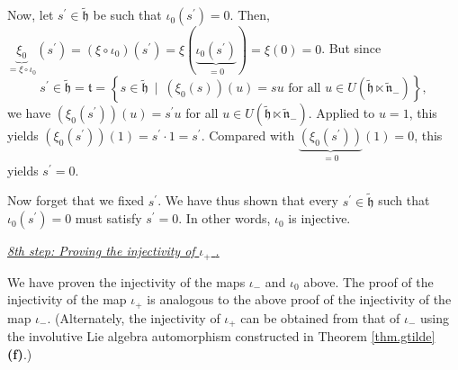 \documentclass[etingof-lie.tex]{subfiles}
\begin{document}
\begin{verlong}
Now, let $s^{\prime}\in\widetilde{\mathfrak{h}}$ be such that $\iota
_{0}\left(  s^{\prime}\right)  =0$. Then, $\underbrace{\xi_{0}}_{=\xi
\circ\iota_{0}}\left(  s^{\prime}\right)  =\left(  \xi\circ\iota_{0}\right)
\left(  s^{\prime}\right)  =\xi\left(  \underbrace{\iota_{0}\left(  s^{\prime
}\right)  }_{=0}\right)  =\xi\left(  0\right)  =0$. But since%
\[
s^{\prime}\in\widetilde{\mathfrak{h}}=\mathfrak{t}=\left\{  s\in
\widetilde{\mathfrak{h}}\ \mid\ \left(  \xi_{0}\left(  s\right)  \right)
\left(  u\right)  =su\text{ for all }u\in U\left(  \widetilde{\mathfrak{h}%
}\ltimes\widetilde{\mathfrak{n}}_{-}\right)  \right\}  ,
\]
we have $\left(  \xi_{0}\left(  s^{\prime}\right)  \right)  \left(  u\right)
=s^{\prime}u$ for all $u\in U\left(  \widetilde{\mathfrak{h}}\ltimes
\widetilde{\mathfrak{n}}_{-}\right)  $. Applied to $u=1$, this yields $\left(
\xi_{0}\left(  s^{\prime}\right)  \right)  \left(  1\right)  =s^{\prime}%
\cdot1=s^{\prime}$. Compared with $\underbrace{\left(  \xi_{0}\left(
s^{\prime}\right)  \right)  }_{=0}\left(  1\right)  =0$, this yields
$s^{\prime}=0$.

Now forget that we fixed $s^{\prime}$. We have thus shown that every
$s^{\prime}\in\widetilde{\mathfrak{h}}$ such that $\iota_{0}\left(  s^{\prime
}\right)  =0$ must satisfy $s^{\prime}=0$. In other words, $\iota_{0}$ is injective.
\end{verlong}

\bigskip

\underline{\textit{8th step: Proving the injectivity of }$\iota_{+}$%
\textit{.}}

\begin{vershort}
We have proven the injectivity of the maps $\iota_{-}$ and $\iota_{0}$ above.
The proof of the injectivity of the map $\iota_{+}$ is analogous to the above
proof of the injectivity of the map $\iota_{-}$. (Alternately, the injectivity
of $\iota_{+}$ can be obtained from that of $\iota_{-}$ using the involutive
Lie algebra automorphism constructed in Theorem \ref{thm.gtilde} \textbf{(f)}.)
\end{vershort}
\end{document}
